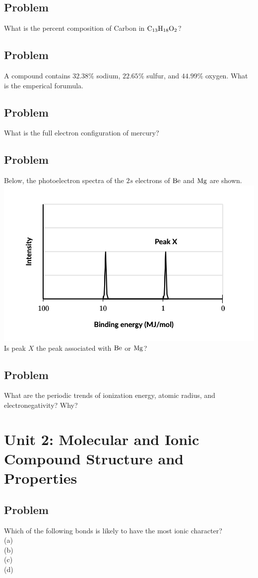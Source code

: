 \documentclass{article}
\begin{document}
\subsection*{Problem \countThis}
What is the percent composition of Carbon in \(\ce{C_{13}H_{18}O_2}\)?
\subsection*{Problem \countThis}
A compound contains \(32.38\%\) sodium, \(22.65\%\) sulfur, and \(44.99\%\) oxygen. What is the emperical forumula. 
\subsection*{Problem \countThis}
What is the full electron configuration of mercury?
\subsection*{Problem \countThis}
Below, the photoelectron spectra of the \(2s\) electrons of \(\ce{Be}\) and \(\ce{Mg}\) are shown.
\includegraphics[scale = 0.5]{photos/photo2.png} \\
Is peak \(X\) the peak associated with \(\ce{Be}\) or \(\ce{Mg}\)?
\subsection*{Problem \countThis}
What are the periodic trends of ionization energy, atomic radius, and electronegativity? Why?
\section{Unit 2: Molecular and Ionic Compound Structure and Properties}
\subsection*{Problem \countThis}
Which of the following bonds is likely to have the most ionic character? \\
(a)  \\
(b)  \\
(c) \\
(d) 
\end{document}
